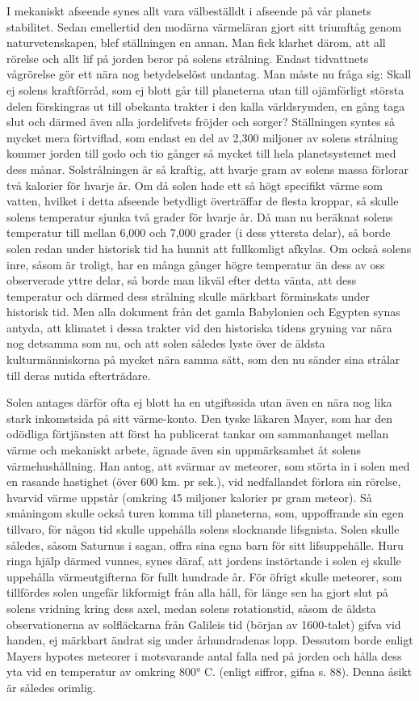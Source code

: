 \documentclass[a4paper, 12pt, oneside, swedish]{article}
\begin{document}
I mekaniskt afseende synes allt vara välbeställdt i afseende på vår planets stabilitet. Sedan emellertid den modärna värmeläran gjort sitt triumftåg genom naturvetenskapen, blef ställningen en annan. Man fick klarhet därom, att all rörelse och allt lif på jorden beror på solens strålning. Endast tidvattnets vågrörelse gör ett nära nog betydelselöst undantag. Man måste nu fråga sig: Skall ej solens kraftförråd, som ej blott går till planeterna utan till ojämförligt största delen förskingras ut till obekanta trakter i den kalla världsrymden, en gång taga slut och därmed även alla jordelifvets fröjder och sorger? Ställningen syntes så mycket mera förtviflad, som endast en del av 2,300 miljoner av solens strålning kommer jorden till godo och tio gånger så mycket till hela planetsystemet med dess månar. Solstrålningen är så kraftig, att hvarje gram av solens massa förlorar två kalorier för hvarje år. Om då solen hade ett så högt specifikt värme som vatten, hvilket i detta afseende betydligt överträffar de flesta kroppar, så skulle solens temperatur sjunka två grader för hvarje år. Då man nu beräknat solens temperatur till mellan 6,000 och 7,000 grader (i dess yttersta delar), så borde solen redan under historisk tid ha hunnit att fullkomligt afkylas. Om också solens inre, såsom är troligt, har en många gånger högre temperatur än dess av oss observerade yttre delar, så borde man likväl efter detta vänta, att dess temperatur och därmed dess strålning skulle märkbart förminskats under historisk tid. Men alla dokument från det gamla Babylonien och Egypten synas antyda, att klimatet i dessa trakter vid den historiska tidens gryning var nära nog detsamma som nu, och att solen således lyste över de äldsta kulturmänniskorna på mycket nära samma sätt, som den nu sänder sina strålar till deras nutida efterträdare.

Solen antages därför ofta ej blott ha en utgiftssida utan även en nära nog lika stark inkomstsida på sitt värme-konto. Den tyske läkaren Mayer, som har den odödliga förtjänsten att först ha publicerat tankar om sammanhanget mellan värme och mekaniskt arbete, ägnade även sin uppmärksamhet åt solens värmehushållning. Han antog, att svärmar av meteorer, som störta in i solen med en rasande hastighet (över 600 km. pr sek.), vid nedfallandet förlora sin rörelse, hvarvid värme uppstår (omkring 45 miljoner kalorier pr gram meteor). Så småningom skulle också turen komma till planeterna, som, uppoffrande sin egen tillvaro, för någon tid skulle uppehålla solens slocknande lifsgnista. Solen skulle således, såsom Saturnus i sagan, offra sina egna barn för sitt lifsuppehälle. Huru ringa hjälp därmed vunnes, synes däraf, att jordens instörtande i solen ej skulle uppehålla värmeutgifterna för fullt hundrade år. För öfrigt skulle meteorer, som tillfördes solen ungefär likformigt från alla håll, för länge sen ha gjort slut på solens vridning kring dess axel, medan solens rotationstid, såsom de äldsta observationerna av solfläckarna från Galileis tid (början av 1600-talet) gifva vid handen, ej märkbart ändrat sig under århundradenas lopp. Dessutom borde enligt Mayers hypotes meteorer i motsvarande antal falla ned på jorden och hålla dess yta vid en temperatur av omkring 800° C. (enligt siffror, gifna s. 88). Denna åsikt är således orimlig.
\end{document}
